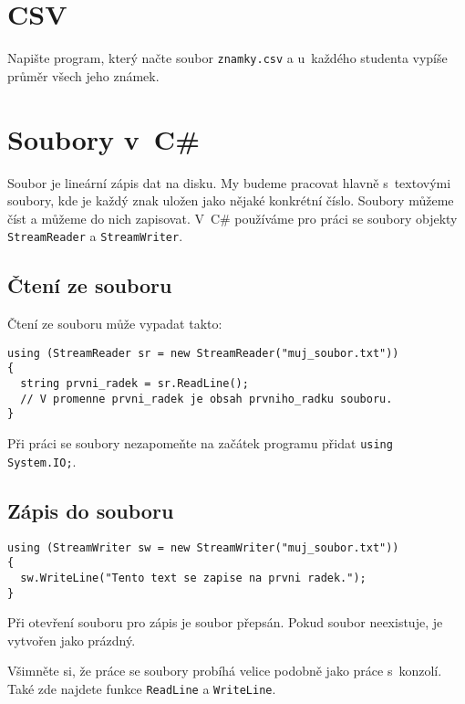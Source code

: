 \documentclass[12pt,a4paper]{article}
\begin{document}
\section{CSV}

Napište program, který načte soubor \texttt{znamky.csv} a u~každého studenta
vypíše průměr všech jeho známek.

\newpage

\section*{Soubory v~C\#}

Soubor je lineární zápis dat na disku. My budeme pracovat hlavně s~textovými
soubory, kde je každý znak uložen jako nějaké konkrétní číslo. Soubory můžeme
číst a můžeme do nich zapisovat. V~C\# používáme pro práci se soubory objekty
\texttt{StreamReader} a \texttt{StreamWriter}.

\subsection*{Čtení ze souboru}

Čtení ze souboru může vypadat takto:

\begin{verbatim}
using (StreamReader sr = new StreamReader("muj_soubor.txt"))
{
  string prvni_radek = sr.ReadLine();
  // V promenne prvni_radek je obsah prvniho_radku souboru.
}
\end{verbatim}

Při práci se soubory nezapomeňte na začátek programu přidat
\texttt{using System.IO;}.

\subsection*{Zápis do souboru}

\begin{verbatim}
using (StreamWriter sw = new StreamWriter("muj_soubor.txt"))
{
  sw.WriteLine("Tento text se zapise na prvni radek.");
}
\end{verbatim}

Při otevření souboru pro zápis je soubor přepsán. Pokud soubor neexistuje, je
vytvořen jako prázdný.

Všimněte si, že práce se soubory probíhá velice podobně jako práce s~konzolí.
Také zde najdete funkce \texttt{ReadLine} a \texttt{WriteLine}.
\end{document}
